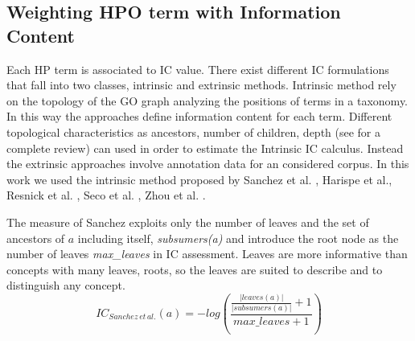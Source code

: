 \documentclass{article}
\theoremstyle{definition}
\begin{document}



 

\subsection{Weighting HPO term with Information Content}
Each HP term is associated to IC value. There exist different IC formulations  that fall into two classes, intrinsic and extrinsic methods. Intrinsic method rely on the topology of the GO graph analyzing the positions of terms in a taxonomy. In this way the approaches define information content for each term. Different topological characteristics as ancestors, number of children, depth (see\cite{harispe2013framework} for a complete review) can used in order to estimate the Intrinsic IC calculus. Instead the extrinsic approaches involve annotation data for an considered corpus.
In this work we used the intrinsic method proposed by Sanchez et al. \cite{sanchez2011ontology}, Harispe et al.\cite{harispe2013framework}, Resnick et al. \cite{resnink:simmeasure:879855}, Seco et al.  \cite{14755292}, Zhou et al. \cite{zhou2008new}. 

The measure of Sanchez exploits only the number of leaves and the set of  ancestors of $a$ including itself, \emph{subsumers(a)} and introduce the root node as the number of leaves \emph{max\_leaves} in IC assessment. Leaves are more informative than concepts with many leaves, roots, so the leaves are suited  to describe and to distinguish any concept.
\begin{equation}
IC_{Sanchez\,et\,al.}(a) =-log\left(\frac{\frac{|leaves(a)|}{|subsumers(a)|}+1}{max\_leaves+1} \right)
\end{equation}
\end{document}

